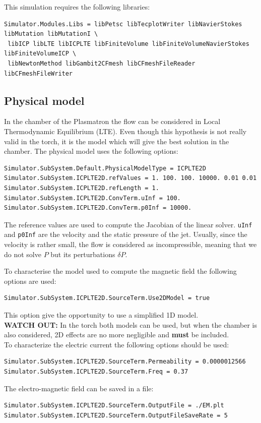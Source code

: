 \documentclass[11pt]{article}
\begin{document}
This simulation requires the following libraries: 
\begin{verbatim}
Simulator.Modules.Libs = libPetsc libTecplotWriter libNavierStokes libMutation libMutationI \
 libICP libLTE libICPLTE libFiniteVolume libFiniteVolumeNavierStokes libFiniteVolumeICP \
 libNewtonMethod libGambit2CFmesh libCFmeshFileReader libCFmeshFileWriter
\end{verbatim}

\subsection{Physical model}
In the chamber of the Plasmatron the flow can be considered in Local Thermodynamic Equilibrium (LTE). Even though this
hypothesis is not really valid in the torch, it is the model which will give the best solution in the chamber. 
The physical model uses the following options:
\begin{verbatim}
Simulator.SubSystem.Default.PhysicalModelType = ICPLTE2D
Simulator.SubSystem.ICPLTE2D.refValues = 1. 100. 100. 10000. 0.01 0.01 
Simulator.SubSystem.ICPLTE2D.refLength = 1.
Simulator.SubSystem.ICPLTE2D.ConvTerm.uInf = 100.
Simulator.SubSystem.ICPLTE2D.ConvTerm.p0Inf = 10000.
\end{verbatim}
The reference values are used to compute the Jacobian of the linear solver.
\texttt{uInf} and \texttt{p0Inf} are the velocity and the static pressure of the jet. 
Usually, since the velocity is rather small, the flow is considered as incompressible, 
meaning that we do not solve $P$ but its perturbations $\delta P$.

To characterise the model used to compute the magnetic field the following options are used:
\begin{verbatim}
Simulator.SubSystem.ICPLTE2D.SourceTerm.Use2DModel = true
\end{verbatim}
This option give the opportunity to use a simplified 1D model. \\
{\bf WATCH OUT:} In the torch both models can be used, but when the chamber is also considered,
2D effects are no more negligible and {\bf must} be included.\\

To characterize the electric current the following options should be used:
\begin{verbatim}
Simulator.SubSystem.ICPLTE2D.SourceTerm.Permeability = 0.0000012566
Simulator.SubSystem.ICPLTE2D.SourceTerm.Freq = 0.37
\end{verbatim}
The electro-magnetic field can be saved in a file: 
\begin{verbatim}
Simulator.SubSystem.ICPLTE2D.SourceTerm.OutputFile = ./EM.plt
Simulator.SubSystem.ICPLTE2D.SourceTerm.OutputFileSaveRate = 5
\end{verbatim}
\end{document}
